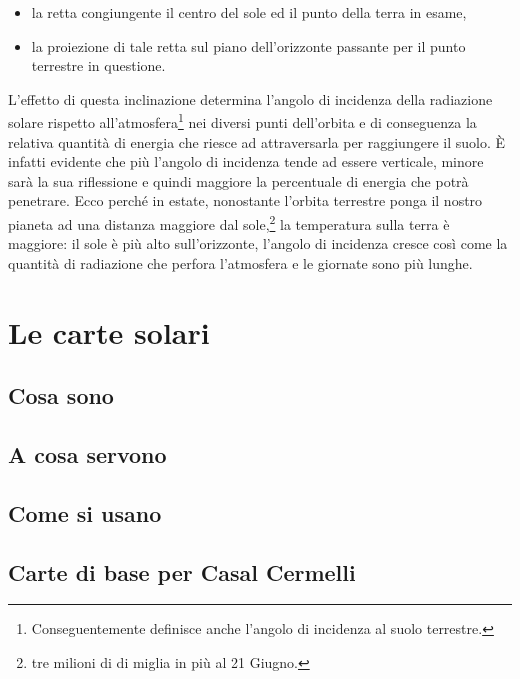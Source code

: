 \begin{itemize}
\item  la retta congiungente il centro del sole ed il punto della terra in esame,
\item la proiezione di tale retta sul piano dell'orizzonte passante per il punto terrestre in questione.
\end{itemize}
 
L'effetto di questa inclinazione determina l'angolo di incidenza della radiazione solare rispetto all'atmosfera\footnote{Conseguentemente definisce anche l'angolo di incidenza al suolo terrestre.} nei diversi punti dell'orbita e di conseguenza la relativa quantità di energia che riesce ad attraversarla per raggiungere il suolo. È infatti evidente che più l'angolo di incidenza tende ad essere verticale, minore sarà la sua riflessione e quindi maggiore la percentuale di energia che potrà penetrare. Ecco perché in estate, nonostante l'orbita terrestre ponga il nostro pianeta ad una distanza maggiore dal sole,\footnote{tre milioni di di miglia in più al 21 Giugno.} la temperatura sulla terra è maggiore: il sole è più alto sull'orizzonte, l'angolo di incidenza cresce così come la quantità di radiazione che perfora l'atmosfera e le giornate sono più lunghe.


\section{Le carte solari}
\label{sec:nota-import}

\subsection{Cosa sono}
\label{subsec:cosa-sono}


\subsection{A cosa servono}
\label{subsec:a-cosa-servono}


\subsection{Come si usano}
\label{subsec:come-si-usano}

\subsection{Carte di base per Casal Cermelli}
\label{subsec:carte-base}